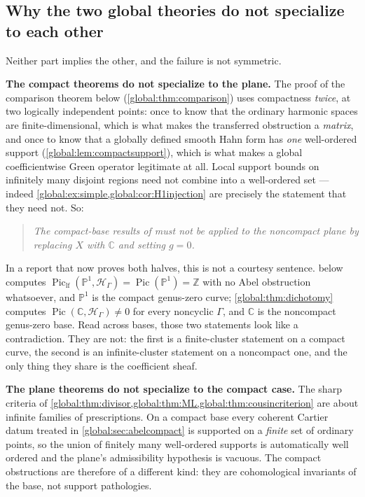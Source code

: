 \documentclass[11pt,letterpaper]{article}
\theoremstyle{definition}
\theoremstyle{remark}
\newcommand{\C}{\mathbb C}
\newcommand{\Z}{\mathbb Z}
\newcommand{\HH}{\mathscr H_\Gamma}
\newcommand{\Pic}{\operatorname{Pic}}
\newcommand{\Piclf}{\operatorname{Pic}_{\mathrm{lf}}}
\numberwithin{equation}{section}
\begin{document}
\subsection{Why the two global theories do not specialize to each other}\label{global:sub:twobasewarning}

Neither part implies the other, and the failure is not symmetric.

\smallskip
\noindent\textbf{The compact theorems do not specialize to the plane.} The proof of the comparison theorem below (\cref{global:thm:comparison}) uses compactness \emph{twice}, at two logically independent points: once to know that the ordinary harmonic spaces are finite-dimensional, which is what makes the transferred obstruction a \emph{matrix}, and once to know that a globally defined smooth Hahn form has \emph{one} well-ordered support (\cref{global:lem:compactsupport}), which is what makes a global coefficientwise Green operator legitimate at all. Local support bounds on infinitely many disjoint regions need not combine into a well-ordered set --- indeed \cref{global:ex:simple,global:cor:H1injection} are precisely the statement that they need not. So:

\begin{quote}\itshape
The compact-base results of  must not be applied to the noncompact plane by replacing $X$ with $\C$ and setting $g=0$.
\end{quote}

In a report that now proves both halves, this is not a courtesy sentence.  below computes $\Piclf(\mathbb P^1,\HH)=\Pic(\mathbb P^1)=\Z$ with no Abel obstruction whatsoever, and $\mathbb P^1$ is the compact genus-zero curve; \cref{global:thm:dichotomy} computes $\Pic(\C,\HH)\ne0$ for every noncyclic $\Gamma$, and $\C$ is the noncompact genus-zero base. Read across bases, those two statements look like a contradiction. They are not: the first is a finite-cluster statement on a compact curve, the second is an infinite-cluster statement on a noncompact one, and the only thing they share is the coefficient sheaf.

\smallskip
\noindent\textbf{The plane theorems do not specialize to the compact case.} The sharp criteria of \cref{global:thm:divisor,global:thm:ML,global:thm:cousincriterion} are about infinite families of prescriptions. On a compact base every coherent Cartier datum treated in \cref{global:sec:abelcompact} is supported on a \emph{finite} set of ordinary points, so the union of finitely many well-ordered supports is automatically well ordered and the plane's admissibility hypothesis is vacuous. The compact obstructions are therefore of a different kind: they are cohomological invariants of the base, not support pathologies.
\end{document}
